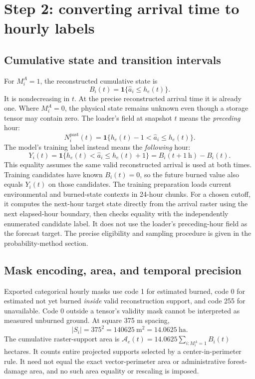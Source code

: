 \documentclass[11pt,a4paper]{article}
\newcommand{\Ind}{\mathbf{1}}
\begin{document}
\section{Step 2: converting arrival time to hourly labels}
\label{sec:labels}
\subsection{Cumulative state and transition intervals}
For $M_i^A=1$, the reconstructed cumulative state is
\begin{equation}
B_i(t)=\Ind\{\widehat a_i\le h_e(t)\}.
\end{equation}
It is nondecreasing in $t$. At the precise reconstructed arrival time it is
already one. Where $M_i^A=0$, the physical state remains unknown even though a
storage tensor may contain zero.
The loader's field  at snapshot $t$ means the
\emph{preceding} hour:
\begin{equation}
N_i^{\mathrm{past}}(t)=
\Ind\{h_e(t)-1<\widehat a_i\le h_e(t)\}.
\label{eq:pastlabel}
\end{equation}
The model's training label instead means the \emph{following} hour:
\begin{equation}
Y_i(t)=\Ind\{h_e(t)<\widehat a_i\le h_e(t)+1\}
       =B_i(t+1\ \mathrm h)-B_i(t).
\label{eq:futurelabel}
\end{equation}
This equality assumes the same valid reconstructed arrival is used at both
times. Training candidates have known $B_i(t)=0$, so the future burned value
also equals $Y_i(t)$ on those candidates. The training preparation loads current environmental and burned-state
contexts in 24-hour chunks. For a chosen cutoff, it computes the next-hour
target state directly from the arrival raster using the next elapsed-hour
boundary, then checks equality with the independently enumerated candidate
label. It does not use the loader's preceding-hour field as the forecast
target. The precise eligibility and sampling procedure is given
in the probability-method section.

\subsection{Mask encoding, area, and temporal precision}
Exported categorical hourly masks use code 1 for estimated burned, code 0 for
estimated not yet burned \emph{inside} valid reconstruction support, and code
255 for unavailable. Code 0 outside a tensor's validity mask cannot be
interpreted as measured unburned ground.
At square 375 m spacing,
\begin{equation}
|S_i|=375^2=140625\ \mathrm{m^2}=14.0625\ \mathrm{ha}.
\end{equation}
The cumulative raster-support area is
$\mathcal A_e(t)=14.0625\sum_{i:M_i^A=1}B_i(t)$ hectares. It counts entire projected
supports selected by a center-in-perimeter rule. It need not equal the exact
vector-perimeter area or administrative forest-damage area, and no such area
equality or rescaling is imposed.
\end{document}
